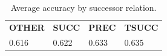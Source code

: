 \documentclass[twoside,11pt]{article}
\newcommand{\tbf}[1]{\textbf{#1}}
\begin{document}

\begin{table}[ht]
  \centering
  \begin{tabular}{llll}
    \toprule
    \tbf{OTHER} & \tbf{SUCC} & \tbf{PREC} & \tbf{TSUCC} \\
    0.616       & 0.622      & 0.633      & 0.635       \\
    \bottomrule
  \end{tabular}
  \caption{Average accuracy by successor relation.}
  \label{tab:successor-avg}
\end{table}
\end{document}
